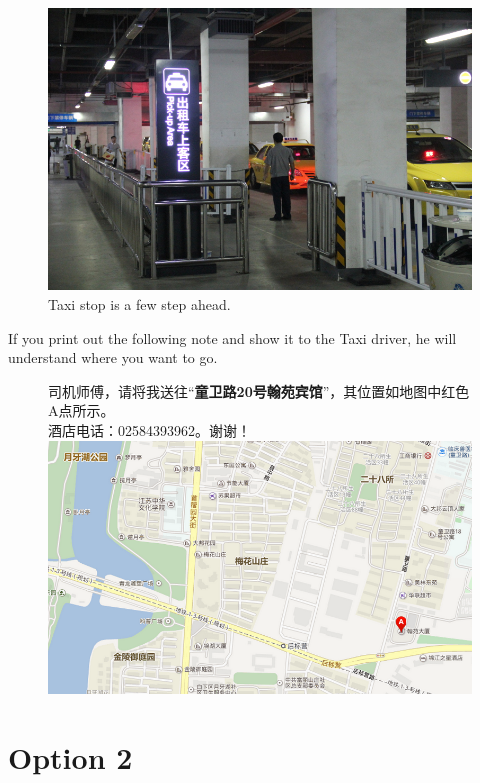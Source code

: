 \documentclass[11pt]{article}
\begin{document}
\begin{figure}[!h]
    \centering
    	\includegraphics[scale=0.27]{IMG_7201.jpg}
    	\caption{Taxi stop is a few step ahead.\label{7201}}
 \end{figure}

  \clearpage

If you print out the following note and show it to the Taxi driver, he will understand where you want to go.

\begin{figure}[!h]
	 	\centering
	 司机师傅，请将我送往``{\bf 童卫路20号翰苑宾馆}''，其位置如地图中红色A点所示。\\
	 酒店电话：02584393962。谢谢！\\ \vspace{5mm}
     \includegraphics[scale=0.5]{badu.png}
\end{figure}

\section{Option 2}
\end{document}

